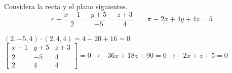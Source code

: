 \documentclass[addpoints,spanish, 12pt,a4paper]{exam}
\begin{document}
\begin{questions}
\question[3] Considera la recta y el plano siguientes. $$r\equiv \frac{x-1}{2}=\frac{y+5}{-5}=\frac{z+3}{4}\quad \quad \pi \equiv 2x+4y+4z=5$$
\begin{solution}
    $(2,-5,4)\cdot (2,4,4)=4-20+16=0$ \\
    $\left[\begin{matrix}x - 1 & y + 5 & z + 3\\2 & -5 & 4\\2 & 4 & 4\end{matrix}\right]=0 \to - 36 x + 18 z + 90=0 \to -2x+z+5=0$
\end{solution}





\end{questions}
\end{document}
